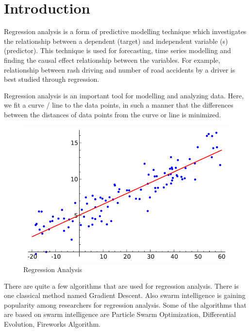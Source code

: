 \documentclass[11pt, a4paper]{report}
\begin{document}
\listoffigures


\newpage

\listoftables

\newpage
\chapter{Introduction}
Regression analysis is a form of predictive modelling technique which investigates the relationship between a dependent (target) and independent variable (s) (predictor). This technique is used for forecasting, time series modelling and finding the causal effect relationship between the variables. For example, relationship between rash driving and number of road accidents by a driver is best studied through regression. 

Regression analysis is an important tool for modelling and analyzing data. Here, we fit a curve / line to the data points, in such a manner that the differences between the distances of data points from the curve or line is minimized.  \cite{desc:RegressionAnalysis}
\\
\begin{figure}[!bth]
	\center
	\includegraphics[scale=0.6]{images/Linear_regression}
	\caption[Regression Analysis]{Regression Analysis \cite{wiki:LinearRegression}}
	\label{fig:regressionanalysis}

\end{figure}

There are quite a few algorithms that are used for regression analysis. There is one classical method named Gradient Descent. Also swarm intelligence is gaining popularity among researchers for regression analysis. Some of the algorithms that are based on swarm intelligence are Particle Swarm Optimization, Differential Evolution, Fireworks Algorithm. 
\end{document}
